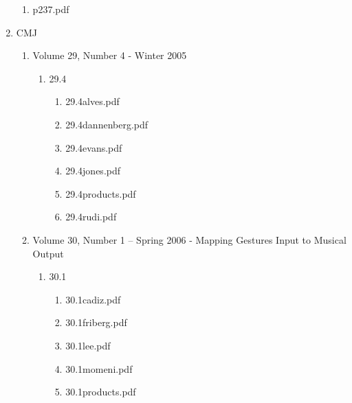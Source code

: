 \documentclass[11pt]{article}
\begin{document}
\begin{enumerate}
\begin{enumerate}
\item p237.pdf
\label{sec-1-1-1-1-11-19-18-3}
\end{enumerate}

\item CMJ
\label{sec-1-1-1-1-11-19-19}
\begin{enumerate}
\item Volume 29, Number 4 - Winter 2005
\label{sec-1-1-1-1-11-19-19-1}
\begin{enumerate}
\item 29.4
\label{sec-1-1-1-1-11-19-19-1-1}
\begin{enumerate}
\item 29.4alves.pdf
\label{sec-1-1-1-1-11-19-19-1-1-1}

\item 29.4dannenberg.pdf
\label{sec-1-1-1-1-11-19-19-1-1-2}

\item 29.4evans.pdf
\label{sec-1-1-1-1-11-19-19-1-1-3}

\item 29.4jones.pdf
\label{sec-1-1-1-1-11-19-19-1-1-4}

\item 29.4products.pdf
\label{sec-1-1-1-1-11-19-19-1-1-5}

\item 29.4rudi.pdf
\label{sec-1-1-1-1-11-19-19-1-1-6}
\end{enumerate}
\end{enumerate}

\item Volume 30, Number 1 – Spring 2006 - Mapping Gestures Input to Musical Output
\label{sec-1-1-1-1-11-19-19-2}
\begin{enumerate}
\item 30.1
\label{sec-1-1-1-1-11-19-19-2-1}
\begin{enumerate}
\item 30.1cadiz.pdf
\label{sec-1-1-1-1-11-19-19-2-1-1}

\item 30.1friberg.pdf
\label{sec-1-1-1-1-11-19-19-2-1-2}

\item 30.1lee.pdf
\label{sec-1-1-1-1-11-19-19-2-1-3}

\item 30.1momeni.pdf
\label{sec-1-1-1-1-11-19-19-2-1-4}

\item 30.1products.pdf
\label{sec-1-1-1-1-11-19-19-2-1-5}
\end{enumerate}
\end{enumerate}


\end{enumerate}
\end{enumerate}
\end{document}
